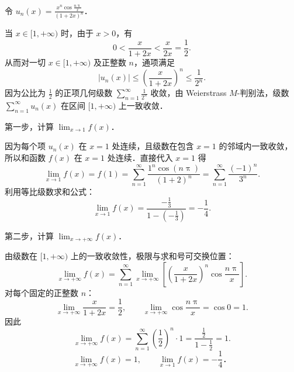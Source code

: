 \begin{solution}
    令 $u_n(x) = \frac{x^n \cos \frac{n\uppi}{x}}{(1 + 2x)^n}$．

    当 $x \in [1, +\infty)$ 时，由于 $x > 0$，有
    \begin{equation}
        0 < \frac{x}{1 + 2x} < \frac{x}{2x} = \frac{1}{2}.
    \end{equation}
    从而对一切 $x \in [1, +\infty)$ 及正整数 $n$，通项满足
    \begin{equation}
        |u_n(x)| \leqslant \left(\frac{x}{1 + 2x}\right)^n \leqslant \frac{1}{2^n}.
    \end{equation}
    因为公比为 $\frac{1}{2}$ 的正项几何级数 $\sum_{n=1}^\infty \frac{1}{2^n}$ 收敛，由 Weierstrass $M$-判别法，级数 $\sum_{n=1}^\infty u_n(x)$ 在区间 $[1, +\infty)$ 上一致收敛．

    第一步，计算 $\lim_{x\to 1} f(x)$．

    因为每个项 $u_n(x)$ 在 $x = 1$ 处连续，且级数在包含 $x = 1$ 的邻域内一致收敛，所以和函数 $f(x)$ 在 $x = 1$ 处连续．直接代入 $x = 1$ 得
    \begin{equation}
        \lim_{x\to 1} f(x) = f(1) = \sum_{n=1}^\infty \frac{1^n \cos(n\uppi)}{(1 + 2)^n} = \sum_{n=1}^\infty \frac{(-1)^n}{3^n}.
    \end{equation}
    利用等比级数求和公式：
    \begin{equation}
        \lim_{x\to 1} f(x) = \frac{-\frac{1}{3}}{1 - \left(-\frac{1}{3}\right)} = -\frac{1}{4}.
    \end{equation}

    第二步，计算 $\lim_{x\to +\infty} f(x)$．

    由级数在 $[1, +\infty)$ 上的一致收敛性，极限与求和号可交换位置：
    \begin{equation}
        \lim_{x\to+\infty} f(x) = \sum_{n=1}^\infty \lim_{x\to+\infty} \left[ \left(\frac{x}{1 + 2x}\right)^n \cos \frac{n\uppi}{x} \right].
    \end{equation}
    对每个固定的正整数 $n$：
    \begin{equation}
        \lim_{x\to+\infty} \frac{x}{1 + 2x} = \frac{1}{2}, \qquad \lim_{x\to+\infty} \cos \frac{n\uppi}{x} = \cos 0 = 1.
    \end{equation}
    因此
    \begin{equation}
        \lim_{x\to+\infty} f(x) = \sum_{n=1}^\infty \left(\frac{1}{2}\right)^n \cdot 1 = \frac{\frac{1}{2}}{1 - \frac{1}{2}} = 1.
    \end{equation}
    \begin{equation}
        \boxed{\lim_{x\to +\infty} f(x) = 1, \qquad \lim_{x\to 1} f(x) = -\frac{1}{4}．}
    \end{equation}
\end{solution}


